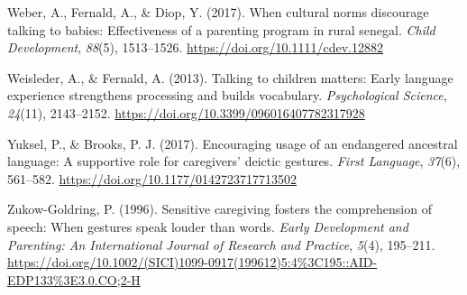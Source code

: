 \documentclass[
  english,
  man,mask]{apa6}
\begin{document}
\leavevmode\hypertarget{ref-weber_when_2017}{}%
Weber, A., Fernald, A., \& Diop, Y. (2017). When cultural norms discourage talking to babies: Effectiveness of a parenting program in rural senegal. \emph{Child Development}, \emph{88}(5), 1513--1526. \url{https://doi.org/10.1111/cdev.12882}

\leavevmode\hypertarget{ref-weisleder_talking_2013}{}%
Weisleder, A., \& Fernald, A. (2013). Talking to children matters: Early language experience strengthens processing and builds vocabulary. \emph{Psychological Science}, \emph{24}(11), 2143--2152. \url{https://doi.org/10.3399/096016407782317928}

\leavevmode\hypertarget{ref-yuksel_encouraging_2017}{}%
Yuksel, P., \& Brooks, P. J. (2017). Encouraging usage of an endangered ancestral language: A supportive role for caregivers' deictic gestures. \emph{First Language}, \emph{37}(6), 561--582. \url{https://doi.org/10.1177/0142723717713502}

\leavevmode\hypertarget{ref-zukow-goldring_sensitive_1996}{}%
Zukow-Goldring, P. (1996). Sensitive caregiving fosters the comprehension of speech: When gestures speak louder than words. \emph{Early Development and Parenting: An International Journal of Research and Practice}, \emph{5}(4), 195--211. \url{https://doi.org/10.1002/(SICI)1099-0917(199612)5:4\%3C195::AID-EDP133\%3E3.0.CO;2-H}
\end{document}
